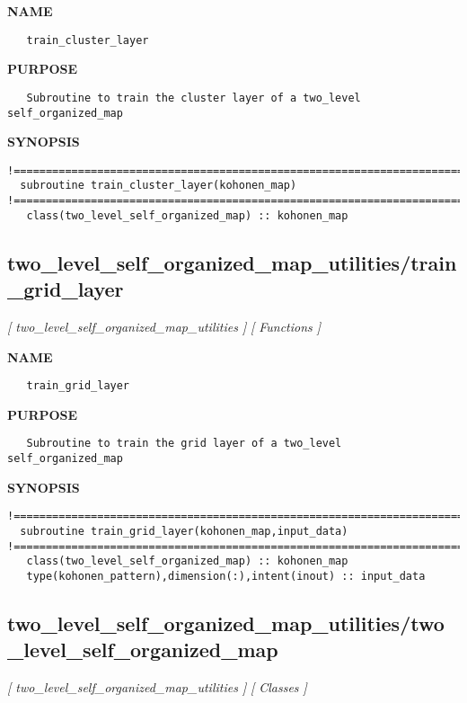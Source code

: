 \documentclass{article}
\begin{document}
\label{ch:robo79}
\label{ch:two_level_self_organized_map_utilities_train_cluster_layer}
\textbf{NAME}
\begin{verbatim}
   train_cluster_layer
\end{verbatim}
\textbf{PURPOSE}
\begin{verbatim}
   Subroutine to train the cluster layer of a two_level self_organized_map 
\end{verbatim}
\textbf{SYNOPSIS}
\begin{verbatim}
!========================================================================================
  subroutine train_cluster_layer(kohonen_map)
!========================================================================================
   class(two_level_self_organized_map) :: kohonen_map
\end{verbatim}
\newpage
\subsection{two\_level\_self\_organized\_map\_utilities/train\_grid\_layer}
\textsl{[ two\_level\_self\_organized\_map\_utilities ]}
\textsl{[ Functions ]}

\label{ch:robo80}
\label{ch:two_level_self_organized_map_utilities_train_grid_layer}
\textbf{NAME}
\begin{verbatim}
   train_grid_layer
\end{verbatim}
\textbf{PURPOSE}
\begin{verbatim}
   Subroutine to train the grid layer of a two_level self_organized_map 
\end{verbatim}
\textbf{SYNOPSIS}
\begin{verbatim}
!========================================================================================
  subroutine train_grid_layer(kohonen_map,input_data)
!========================================================================================
   class(two_level_self_organized_map) :: kohonen_map
   type(kohonen_pattern),dimension(:),intent(inout) :: input_data
\end{verbatim}
\newpage
\subsection{two\_level\_self\_organized\_map\_utilities/two\_level\_self\_organized\_map}
\textsl{[ two\_level\_self\_organized\_map\_utilities ]}
\textsl{[ Classes ]}
\end{document}
